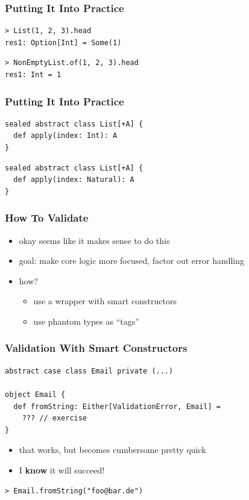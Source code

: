 \documentclass{beamer}
\begin{document}
\begin{frame}[fragile]
  \frametitle{Putting It Into Practice}
\begin{verbatim}
> List(1, 2, 3).head
res1: Option[Int] = Some(1)
\end{verbatim}
\begin{verbatim}
> NonEmptyList.of(1, 2, 3).head
res1: Int = 1
\end{verbatim}
\end{frame}

\begin{frame}
  \frametitle{Putting It Into Practice}
\begin{verbatim}
sealed abstract class List[+A] {
  def apply(index: Int): A
}
\end{verbatim}

\begin{verbatim}
sealed abstract class List[+A] {
  def apply(index: Natural): A
}
\end{verbatim}
\end{frame}

\begin{frame}
  \frametitle{How To Validate}
  \begin{itemize}
  \item okay seems like it makes sense to do this
  \item goal: make core logic more focused, factor out error handling
  \item how?
    \begin{itemize}
    \item use a wrapper with smart constructors
    \item use phantom types as ``tags''
    \end{itemize}
  \end{itemize}
\end{frame}

\begin{frame}
  \frametitle{Validation With Smart Constructors}
\begin{verbatim}
abstract case class Email private (...)

object Email {
  def fromString: Either[ValidationError, Email] = 
    ??? // exercise
}
\end{verbatim}
  \begin{itemize}
  \item that works, but becomes cumbersome pretty quick
  \item I \textbf{know} it will succeed!
  \end{itemize}
\begin{verbatim}
> Email.fromString("foo@bar.de")
\end{verbatim}
\end{frame}
\end{document}
